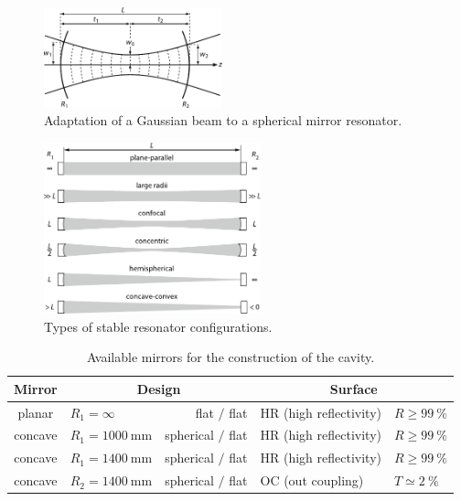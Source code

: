 \begin{figure}[H]
	\centering
	\includegraphics[width=0.46\textwidth]{content/graphics/beam.pdf}
	\caption{Adaptation of a Gaussian beam to a spherical mirror resonator. \cite{Eichler_2018}}
	\label{fig:beam}
\end{figure}

\begin{figure}[H]
	\centering
	\includegraphics[width=0.56\textwidth]{content/graphics/resonators.pdf}
	\caption{Types of stable resonator configurations. \cite{Eichler_2018}}
	\label{fig:resonators}
\end{figure}

\begin{table}
	\centering
	\caption{Available mirrors for the construction of the cavity.}
	\begin{tabular}{clrll}
		\toprule
		Mirror & \multicolumn{2}{c}{Design} & \multicolumn{2}{c}{Surface} \\
		\midrule
		planar  & $R_1 = \infty$ & flat $\mathbin{/}$ flat & HR (high reflectivity) & $R \geq \qty{99}{\percent}$ \\
		concave & $R_1 = \qty{1000}{\milli\meter}$ & spherical $\mathbin{/}$ flat & HR (high reflectivity) & $R \geq \qty{99}{\percent}$ \\
		concave & $R_1 = \qty{1400}{\milli\meter}$ & spherical $\mathbin{/}$ flat & HR (high reflectivity) & $R \geq \qty{99}{\percent}$ \\
		concave & $R_2 = \qty{1400}{\milli\meter}$ & spherical $\mathbin{/}$ flat & OC (out coupling) & $T \simeq \qty{2}{\percent}$ \\
		\bottomrule
	\end{tabular}
	\label{tab:config}
\end{table}

